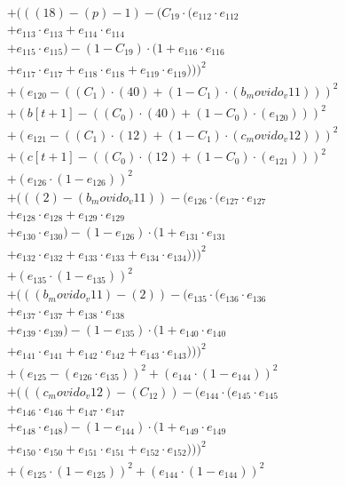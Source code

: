 \documentclass[10pt, a4paper]{article}
\begin{document}
\begin{small}
\begin{align*}
& + (((18) - (p) - 1) - (C_{19} \cdot (e_{112} \cdot e_{112} \\
& + e_{113} \cdot e_{113} + e_{114} \cdot e_{114} \\
& + e_{115} \cdot e_{115}) - (1 - C_{19}) \cdot (1 + e_{116} \cdot e_{116} \\
& + e_{117} \cdot e_{117} + e_{118} \cdot e_{118} + e_{119} \cdot e_{119})))^{2} \\
& + (e_{120} - ((C_{1})  \cdot  (40) + (1 - C_{1})  \cdot  (b_movido_v11)))^{2} \\
& + (b[t+1] - ((C_{0})  \cdot  (40) + (1 - C_{0})  \cdot  (e_{120})))^{2} \\
& + (e_{121} - ((C_{1})  \cdot  (12) + (1 - C_{1})  \cdot  (c_movido_v12)))^{2} \\
& + (c[t+1] - ((C_{0})  \cdot  (12) + (1 - C_{0})  \cdot  (e_{121})))^{2} \\
& + (e_{126} \cdot (1 - e_{126}))^{2} \\
& + (((2) - (b_movido_v11)) - (e_{126} \cdot (e_{127} \cdot e_{127} \\
& + e_{128} \cdot e_{128} + e_{129} \cdot e_{129} \\
& + e_{130} \cdot e_{130}) - (1 - e_{126}) \cdot (1 + e_{131} \cdot e_{131} \\
& + e_{132} \cdot e_{132} + e_{133} \cdot e_{133} + e_{134} \cdot e_{134})))^{2} \\
& + (e_{135} \cdot (1 - e_{135}))^{2} \\
& + (((b_movido_v11) - (2)) - (e_{135} \cdot (e_{136} \cdot e_{136} \\
& + e_{137} \cdot e_{137} + e_{138} \cdot e_{138} \\
& + e_{139} \cdot e_{139}) - (1 - e_{135}) \cdot (1 + e_{140} \cdot e_{140} \\
& + e_{141} \cdot e_{141} + e_{142} \cdot e_{142} + e_{143} \cdot e_{143})))^{2} \\
& + (e_{125} - (e_{126} \cdot e_{135}))^{2} + (e_{144} \cdot (1 - e_{144}))^{2} \\
& + (((c_movido_v12) - (C_{12})) - (e_{144} \cdot (e_{145} \cdot e_{145} \\
& + e_{146} \cdot e_{146} + e_{147} \cdot e_{147} \\
& + e_{148} \cdot e_{148}) - (1 - e_{144}) \cdot (1 + e_{149} \cdot e_{149} \\
& + e_{150} \cdot e_{150} + e_{151} \cdot e_{151} + e_{152} \cdot e_{152})))^{2} \\
& + (e_{125} \cdot (1 - e_{125}))^{2} + (e_{144} \cdot (1 - e_{144}))^{2} \\

\end{align*}
\end{small}
\end{document}
